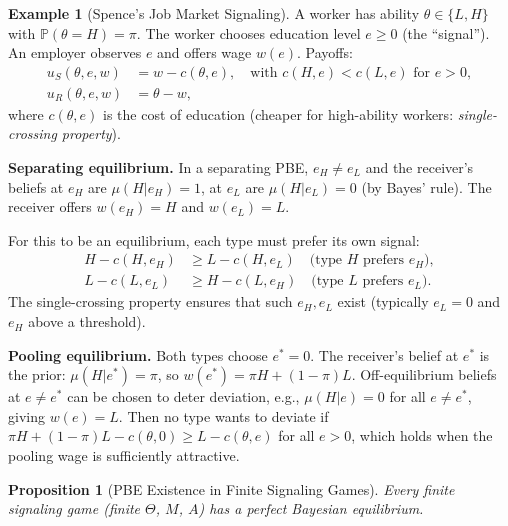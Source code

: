 \documentclass[11pt,a4paper]{article}
\theoremstyle{definition}
\newtheorem{example}{Example}[section]
\theoremstyle{plain}
\newtheorem{proposition}[theorem]{Proposition}
\theoremstyle{remark}
\newcommand{\Prob}{\mathbb{P}}
\begin{document}
\begin{example}[Spence's Job Market Signaling]
\label{ex:spence}
A worker has ability $\theta \in \{L, H\}$ with $\Prob(\theta = H) = \pi$. The worker
chooses education level $e \geq 0$ (the ``signal''). An employer observes $e$ and offers
wage $w(e)$. Payoffs:
\begin{align*}
    u_S(\theta, e, w) &= w - c(\theta, e), \quad \text{with } c(H, e) < c(L, e)
    \text{ for } e > 0, \\
    u_R(\theta, e, w) &= \theta - w,
\end{align*}
where $c(\theta, e)$ is the cost of education (cheaper for high-ability workers:
\emph{single-crossing property}).

\textbf{Separating equilibrium.}
In a separating PBE, $e_H \neq e_L$ and the receiver's beliefs at $e_H$ are
$\mu(H | e_H) = 1$, at $e_L$ are $\mu(H | e_L) = 0$ (by Bayes' rule). The receiver offers
$w(e_H) = H$ and $w(e_L) = L$.

For this to be an equilibrium, each type must prefer its own signal:
\begin{align*}
    H - c(H, e_H) &\geq L - c(H, e_L) \quad \text{(type $H$ prefers $e_H$)}, \\
    L - c(L, e_L) &\geq H - c(L, e_H) \quad \text{(type $L$ prefers $e_L$)}.
\end{align*}
The single-crossing property ensures that such $e_H, e_L$ exist (typically $e_L = 0$ and
$e_H$ above a threshold).

\textbf{Pooling equilibrium.}
Both types choose $e^* = 0$. The receiver's belief at $e^*$ is the prior:
$\mu(H | e^*) = \pi$, so $w(e^*) = \pi H + (1-\pi) L$. Off-equilibrium beliefs at
$e \neq e^*$ can be chosen to deter deviation, e.g., $\mu(H | e) = 0$ for all $e \neq e^*$,
giving $w(e) = L$. Then no type wants to deviate if
$\pi H + (1-\pi)L - c(\theta, 0) \geq L - c(\theta, e)$ for all $e > 0$, which holds
when the pooling wage is sufficiently attractive.
\end{example}

\begin{proposition}[PBE Existence in Finite Signaling Games]
\label{prop:pbe-signaling-existence}
Every finite signaling game (finite $\Theta$, $M$, $A$) has a perfect Bayesian equilibrium.
\end{proposition}
\end{document}

